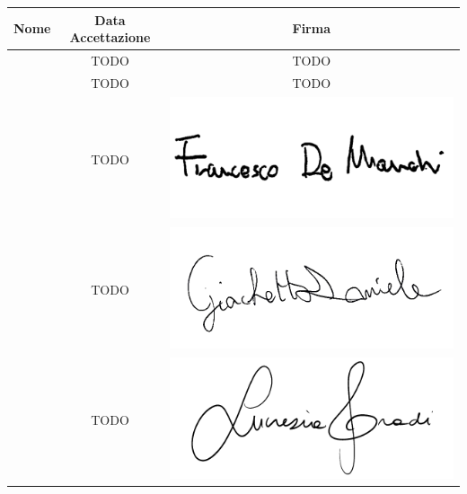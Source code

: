 \renewcommand{\arraystretch}{1}
	\begin{table}[H]
		\begin{center}
			\setlength{\aboverulesep}{0pt}
			\setlength{\belowrulesep}{0pt}
			\setlength{\extrarowheight}{.75ex}
			\begin{tabular}{ c c c}
				\rowcolor{AzzurroGruppo!30} 
				\textbf{Nome} & \textbf{Data Accettazione} & \textbf{Firma} \\
				\toprule
				
				\Davide{} & TODO & TODO \\
				\Giosue{} & TODO & TODO \\
				\Francesco{} & TODO & \includegraphics[scale = 0.16]{components/img/firme_membri/firma-fdm.png} \\
				\Daniele{} & TODO & \includegraphics[scale = 0.16]{components/img/firme_membri/firma-dg.png} \\
				\Lucrezia{} & TODO & \includegraphics[scale = 0.5]{components/img/firme_membri/firma-lg.png} \\

\end{tabular}
\end{center}
\end{table}
